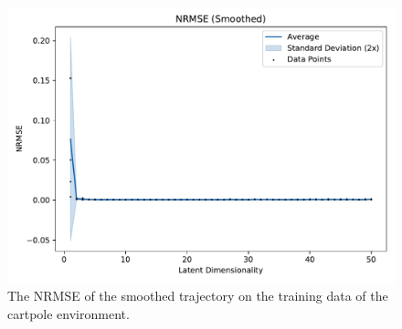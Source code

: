 			\begin{figure}
				\centering
				\includegraphics[width=0.7\linewidth]{figures/results/cartpole-gym/latent-dim/comparison-rmse-smoothed-normalized-mean-vs-latent-dim.pdf}
				\caption[Error of the smoothed trajectory on the training data of the cartpole experiment]{The NRMSE of the smoothed trajectory on the training data of the cartpole environment.}
				\label{fig:cartpoleRmseSmoothed}
			\end{figure}

